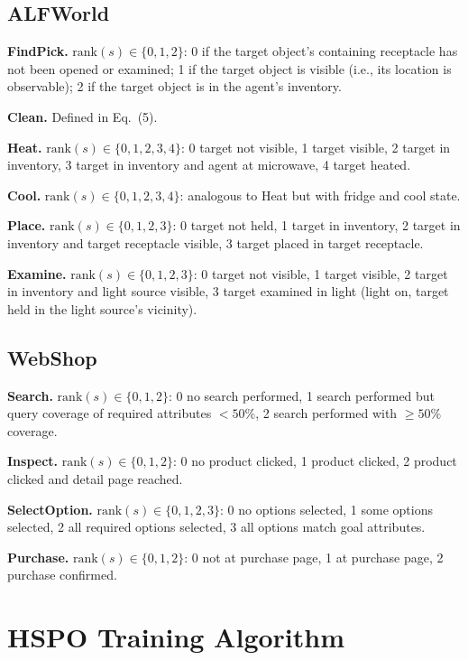 \documentclass{article}
\begin{document}
\subsection{ALFWorld}

\textbf{FindPick.} $\mathrm{rank}(s) \in \{0, 1, 2\}$: 0 if the target object's containing receptacle has not been opened or examined; 1 if the target object is visible (i.e., its location is observable); 2 if the target object is in the agent's inventory.

\textbf{Clean.} Defined in Eq.~(5).

\textbf{Heat.} $\mathrm{rank}(s) \in \{0, 1, 2, 3, 4\}$: 0 target not visible, 1 target visible, 2 target in inventory, 3 target in inventory and agent at microwave, 4 target heated.

\textbf{Cool.} $\mathrm{rank}(s) \in \{0, 1, 2, 3, 4\}$: analogous to Heat but with fridge and cool state.

\textbf{Place.} $\mathrm{rank}(s) \in \{0, 1, 2, 3\}$: 0 target not held, 1 target in inventory, 2 target in inventory and target receptacle visible, 3 target placed in target receptacle.

\textbf{Examine.} $\mathrm{rank}(s) \in \{0, 1, 2, 3\}$: 0 target not visible, 1 target visible, 2 target in inventory and light source visible, 3 target examined in light (light on, target held in the light source's vicinity).

\subsection{WebShop}

\textbf{Search.} $\mathrm{rank}(s) \in \{0, 1, 2\}$: 0 no search performed, 1 search performed but query coverage of required attributes $< 50\%$, 2 search performed with $\geq 50\%$ coverage.

\textbf{Inspect.} $\mathrm{rank}(s) \in \{0, 1, 2\}$: 0 no product clicked, 1 product clicked, 2 product clicked and detail page reached.

\textbf{SelectOption.} $\mathrm{rank}(s) \in \{0, 1, 2, 3\}$: 0 no options selected, 1 some options selected, 2 all required options selected, 3 all options match goal attributes.

\textbf{Purchase.} $\mathrm{rank}(s) \in \{0, 1, 2\}$: 0 not at purchase page, 1 at purchase page, 2 purchase confirmed.
\clearpage

\section{HSPO Training Algorithm}
\label{app:hspo_algorithm}
\end{document}
